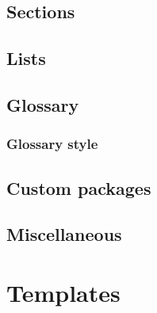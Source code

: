     \subsection{Sections}
    \label{sec:tutorial/preamble/sec}
    
    
    \subsection{Lists}
    \label{sec:tutorial/preamble/list}
    
    
    \subsection{Glossary}
    \label{sec:tutorial/preamble/glossary}
    
    
        \subsubsection{Glossary style}
        \label{sec:tutorial/preamble/glossary/style}
        
    
    \subsection*{\thesubsection\hspace{1em}Custom \glspl{package}}
    \label{sec:tutorial/preamble/custom}
    
    
    \subsection{Miscellaneous}
    \label{sec:tutorial/preamble/misc}
    
    

\newpage
\section{Templates}
\label{sec:tutorial/templates}

